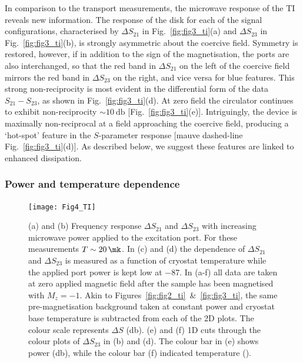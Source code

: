 In comparison to the transport measurements, the microwave response of the TI reveals new information. The response of the disk for each of the signal configurations, characterised by $\Delta S_{21}$ in Fig.~\ref{fig:fig3_ti}(a) and $\Delta S_{23}$ in Fig.~\ref{fig:fig3_ti}(b), is strongly asymmetric about the coercive field. Symmetry is restored, however, if in addition to the sign of the magnetisation, the ports are also interchanged, so that the red band in $\Delta S_{21}$ on the left of the coercive field mirrors the red band in $\Delta S_{23}$ on the right, and vice versa for blue features. This strong non-reciprocity is most evident in the differential form of the data $S_{21} -  S_{23}$, as shown in Fig.~\ref{fig:fig3_ti}(d). At zero field the circulator continues to exhibit non-reciprocity $\sim \SI{10}{\decibel}$ [Fig.~\ref{fig:fig3_ti}(e)]. Intriguingly, the device is maximally non-reciprocal at a field approaching the coercive field, producing a `hot-spot' feature in the $S$-parameter response [mauve dashed-line Fig.~\ref{fig:fig3_ti}(d)]. As described below, we suggest these features are linked to enhanced dissipation.

\subsubsection{Power and temperature dependence}
\begin{figure}
\texttt{[image: Fig4\_TI]}
\caption[Effect of temperature and microwave power]{\label{fig:fig4_ti}(a) and (b) Frequency response $\Delta S_{21}$ and $\Delta S_{23}$ with increasing microwave power applied to the excitation port. For these measurements $T \sim \SI{20}{\mk}$. In (c) and (d) the dependence of $\Delta S_{21}$ and $\Delta S_{23}$ is measured as a function of cryostat temperature while the applied port power is kept low at \SI{-87}{\dBm}. In (a-f)  all data are taken at zero applied magnetic field after the sample has been magnetised with $M_z=-1$. Akin to Figures~\ref{fig:fig2_ti}~\&~\ref{fig:fig3_ti}, the same pre-magnetisation background taken at constant power and cryostat base temperature is subtracted from each of the 2D plots. The colour scale represents $\Delta S$ (\si{\decibel}). (e) and (f) 1D cuts through the colour plots of $\Delta S_{23}$ in (b) and (d). The colour bar in (e) shows power (\si{\decibel}), while the colour bar (f) indicated temperature (\si{\mk}).}
\end{figure}

